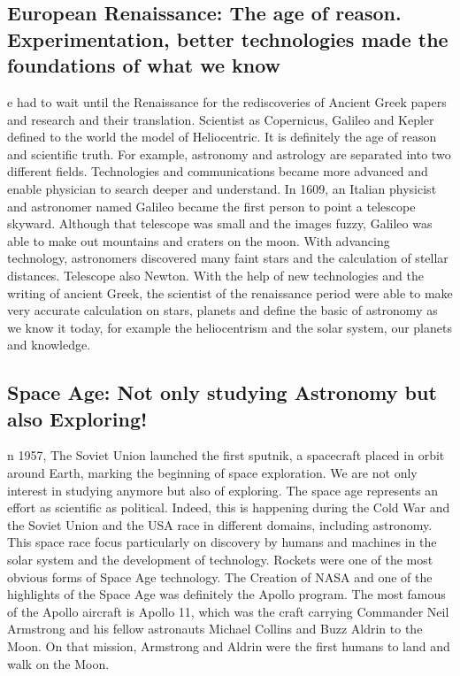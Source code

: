 \subsection*{European Renaissance: The age of reason. Experimentation, better technologies made the foundations of what we know}
e had to wait until the Renaissance for the rediscoveries of Ancient Greek papers and research and their translation.
Scientist as Copernicus, Galileo and Kepler defined to the world the model of Heliocentric.
It is definitely the age of reason and scientific truth.
For example, astronomy and astrology are separated into two different fields.
Technologies and communications became more advanced and enable physician to search deeper and understand.
In 1609, an Italian physicist and astronomer named Galileo became the first person to point a telescope skyward.
Although that telescope was small and the images fuzzy, Galileo was able to make out mountains and craters on the moon.
With advancing technology, astronomers discovered many faint stars and the calculation of stellar distances.
Telescope also Newton.
With the help of new technologies and the writing of ancient Greek, the scientist of the renaissance period were able to make very accurate calculation on stars, planets and define the basic of astronomy as we know it today, for example the heliocentrism and the solar system, our planets and knowledge.

\subsection*{Space Age: Not only studying Astronomy but also Exploring!}
n 1957, The Soviet Union launched the first sputnik, a spacecraft placed in orbit around Earth, marking the beginning of space exploration.
We are not only interest in studying anymore but also of exploring.
The space age represents an effort as scientific as political.
Indeed, this is happening during the Cold War and the Soviet Union and the USA race in different domains, including astronomy.
This space race focus particularly on discovery by humans and machines in the solar system and the development of technology.
Rockets were one of the most obvious forms of Space Age technology.
The Creation of NASA and one of the highlights of the Space Age was definitely the Apollo program. The most famous of the Apollo aircraft is Apollo 11, which was the craft carrying Commander Neil Armstrong and his fellow astronauts Michael Collins and Buzz Aldrin to the Moon.
On that mission, Armstrong and Aldrin were the first humans to land and walk on the Moon.